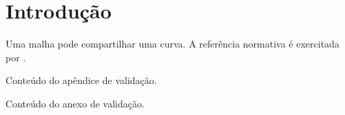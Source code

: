 \documentclass{abntexto-ufc}
\begin{document}
\pretextual
\imprimirsumario

\textual
\section{Introdução}
Uma \gls{malha} pode compartilhar uma \gls{curva}.
A referência normativa é exercitada por \parencite{silva2020}.

\imprimirreferencias
\imprimirglossario

Conteúdo do apêndice de validação.

Conteúdo do anexo de validação.

\imprimirindice
\end{document}
